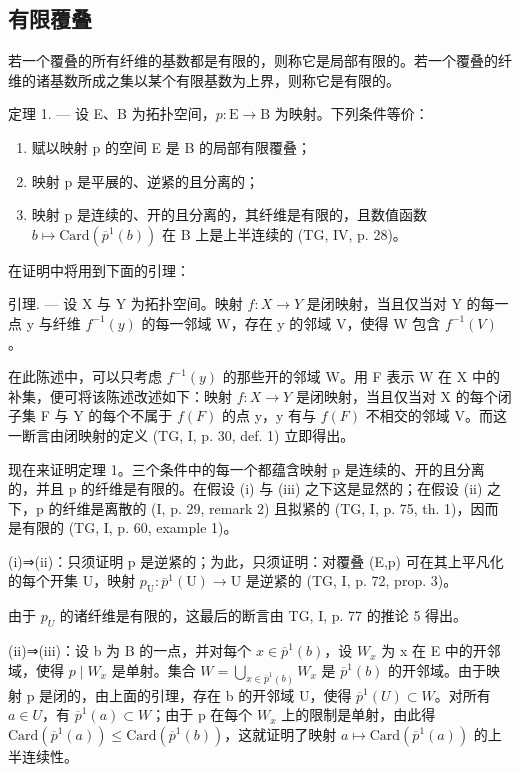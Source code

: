 \subsection{有限覆叠}

若一个覆叠的所有纤维的基数都是有限的，则称它是局部有限的。若一个覆叠的纤维的诸基数所成之集以某个有限基数为上界，则称它是有限的。

定理 1. --- 设 E、B 为拓扑空间，\(p\colon\mathrm{E}\to\mathrm{B}\) 为映射。下列条件等价：

\begin{enumerate}
\def\labelenumi{(\roman{enumi})}
\item
  赋以映射 p 的空间 E 是 B 的局部有限覆叠；
\item
  映射 p 是平展的、逆紧的且分离的；
\item
  映射 p 是连续的、开的且分离的，其纤维是有限的，且数值函数 \(b \mapsto \text{Card}(\overline{p}^{1}(b))\) 在 B 上是上半连续的 (TG, IV, p. 28)。
\end{enumerate}

在证明中将用到下面的引理：

引理. — 设 X 与 Y 为拓扑空间。映射 \(f: X \to Y\) 是闭映射，当且仅当对 Y 的每一点 y 与纤维 \(f^{-1}(y)\) 的每一邻域 W，存在 y 的邻域 V，使得 W 包含 \(f^{-1}(V)\) 。

在此陈述中，可以只考虑 \(f^{-1}(y)\) 的那些开的邻域 W。用 F 表示 W 在 X 中的补集，便可将该陈述改述如下：映射 \(f: X \to Y\) 是闭映射，当且仅当对 X 的每个闭子集 F 与 Y 的每个不属于 \(f(F)\) 的点 y，y 有与 \(f(F)\) 不相交的邻域 V。而这一断言由闭映射的定义 (TG, I, p. 30, def. 1) 立即得出。

现在来证明定理 1。三个条件中的每一个都蕴含映射 p 是连续的、开的且分离的，并且 p 的纤维是有限的。在假设 (i) 与 (iii) 之下这是显然的；在假设 (ii) 之下，p 的纤维是离散的 (I, p. 29, remark 2) 且拟紧的 (TG, I, p. 75, th. 1)，因而是有限的 (TG, I, p. 60, example 1)。

(i)⇒(ii)：只须证明 p 是逆紧的；为此，只须证明：对覆叠 (E,p) 可在其上平凡化的每个开集 U，映射 \(p_{\mathrm{U}}\colon \overline{p}^{1}(\mathrm{U})\to\mathrm{U}\) 是逆紧的 (TG, I, p. 72, prop. 3)。

由于 \(p_{U}\) 的诸纤维是有限的，这最后的断言由 TG, I, p. 77 的推论 5 得出。

(ii)⇒(iii)：设 b 为 B 的一点，并对每个 \(x \in \overline{p}^{1}(b)\)，设 \(W_{x}\) 为 x 在 E 中的开邻域，使得 \(p \mid W_{x}\) 是单射。集合 \(W = \bigcup_{x \in \overline{p}^{1}(b)} W_{x}\) 是 \(\overline{p}^{1}(b)\) 的开邻域。由于映射 p 是闭的，由上面的引理，存在 b 的开邻域 U，使得 \(\overline{p}^{1}(U) \subset W\)。对所有 \(a \in U\)，有 \(\overline{p}^{1}(a) \subset W\)；由于 p 在每个 \(W_{x}\) 上的限制是单射，由此得 \(\text{Card}(\overline{p}^{1}(a)) \leqslant \text{Card}(\overline{p}^{1}(b))\)，这就证明了映射 \(a \mapsto \text{Card}(\overline{p}^{1}(a))\) 的上半连续性。

